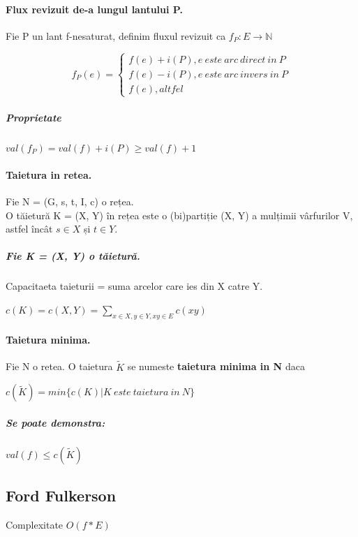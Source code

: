 \documentclass{article}
\begin{document}
\paragraph*{Flux revizuit de-a lungul lantului P.} Fie P un lant f-nesaturat, definim fluxul revizuit ca $f_P : E \to \mathbb{N}$
\begin{center}
    \[ 
    f_P(e) = \left\{
    \begin{array}{ll}
            f(e) + i(P), e \ este \ arc \ direct \ in \ P \\ 
            f(e) - i(P), e \ este \ arc \ invers \ in \ P \\
            f(e), altfel
    \end{array} 
    \right. 
    \]
\end{center}
\subparagraph*{Proprietate} $val(f_P) = val(f) + i(P) \geq val(f) + 1$

\paragraph*{Taietura in retea.} Fie N = (G, {s}, {t}, I, c) o rețea.\\
O tăietură K = (X, Y) în rețea este o (bi)partiție (X, Y) a mulțimii vârfurilor V, astfel încât $s \in X$ și $t \in Y$.
\subparagraph*{Fie K = (X, Y) o tăietură.} Capacitaeta taieturii = suma arcelor care ies din X catre Y.
\begin{center}
    $c(K) = c(X, Y) = \sum_{x \in X, y \in Y, xy \in E}c(xy)$
\end{center}

\paragraph*{Taietura minima.} Fie N o retea. O taietura $\widetilde{K}$ se numeste \textbf{taietura minima in N} daca
\begin{center}
    $c(\widetilde{K}) = min \{c(K) | K \ este \ taietura \ in \ N\}$
\end{center}
\subparagraph*{Se poate demonstra: } $val(f) \leq c(\widetilde{K})$

\subsection*{Ford Fulkerson} Complexitate $O(f*E)$
\end{document}
